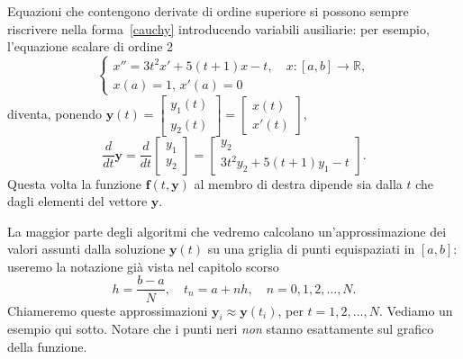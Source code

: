\documentclass[a4paper]{report}
\theoremstyle{definiton}
\theoremstyle{remark}
\newcommand{\y}{\mathbf{y}}
\newcommand{\f}{\mathbf{f}}
\begin{document}
Equazioni che contengono derivate di ordine superiore si possono sempre riscrivere nella forma~\eqref{cauchy} introducendo variabili ausiliarie: per esempio, l'equazione scalare di ordine 2
\[
\begin{cases}
x'' = 3t^2 x' + 5(t+1)x - t, \quad x:[a,b]\to\mathbb{R}, \\
x(a) = 1, \, x'(a) = 0
\end{cases}
\]
diventa, ponendo $\mathbf{y}(t) = \begin{bmatrix}
    y_1(t)\\
    y_2(t)
\end{bmatrix} = \begin{bmatrix}
    x(t)\\
    x'(t)
\end{bmatrix}$,
\[
\frac{d}{dt} \mathbf{y} = 
\frac{d}{dt}
\begin{bmatrix}
    y_1\\ y_2
\end{bmatrix} = \begin{bmatrix}
    y_2\\
    3t^2y_2 + 5(t+1)y_1 - t
\end{bmatrix}.
\]
Questa volta la funzione $\f(t,\y)$ al membro di destra dipende sia dalla $t$ che dagli elementi del vettore $\y$.

La maggior parte degli algoritmi che vedremo calcolano un'approssimazione dei valori assunti dalla soluzione $\y(t)$ su una griglia di punti equispaziati in $[a,b]$: useremo la notazione già vista nel capitolo scorso
\[
h = \frac{b-a}{N}, \quad t_n = a + nh, \quad n = 0,1,2,\dots,N.
\]
Chiameremo queste approssimazioni $\y_i \approx \y(t_i)$, per $t = 1,2,\dots, N$. Vediamo un esempio qui sotto. Notare che i punti neri \emph{non} stanno esattamente sul grafico della funzione.

\end{document}
